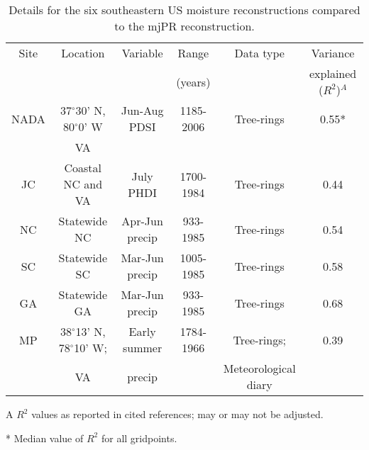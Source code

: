 \begin{table}
  \begin{center}
    \begin{threeparttable}[b]
      \begin{tabular}{cccccc}
\toprule
Site & Location & Variable & Range   & Data type & Variance           \\
     &       &          & (years) &           & explained ($R^2$)$^A$  \\ \midrule
NADA \cite{cook1999drought}          & 37$^{\circ}$30' N, 80$^{\circ}$0' W   & Jun-Aug PDSI   & 1185-2006 & Tree-rings  & 0.55* \\  
                                     & VA                                    &                &           &             &       \\    
JC   \cite{stahle1998lost}           & Coastal NC and VA                     & July PHDI      & 1700-1984 & Tree-rings  & 0.44 \\ 
NC   \cite{stahle1992reconstruction} & Statewide NC                          & Apr-Jun precip & 933-1985  & Tree-rings  & 0.54 \\
SC   \cite{stahle1992reconstruction} & Statewide SC                          & Mar-Jun precip & 1005-1985 & Tree-rings  & 0.58 \\
GA   \cite{stahle1992reconstruction} & Statewide GA                          & Mar-Jun precip & 933-1985  & Tree-rings  & 0.68 \\
MP   \cite{druckenbrod2003late}      & 38$^{\circ}$13' N, 78$^{\circ}$10' W; & Early summer   & 1784-1966 & Tree-rings; & 0.39 \\ 
                                     & VA                                    & precip         &           & Meteorological diary \\ \bottomrule
      \end{tabular}
      \begin{tablenotes}
      \item [A] $R^2$ values as reported in cited references; may or may not be adjusted.
      \item [*] Median value of $R^2$ for all gridpoints.
      \end{tablenotes}
  \label{table:reconDeets}
    \end{threeparttable}
  \end{center}
  \caption{Details for the six southeastern US moisture reconstructions compared to the mjPR reconstruction.}
  \vspace{2cm}
\end{table}


